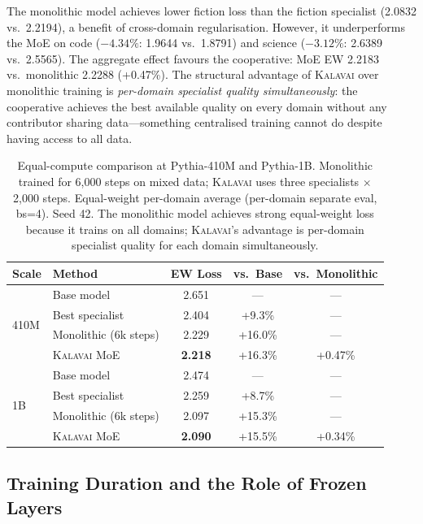 \documentclass{article}
\newcommand{\kalavai}{\textsc{Kalavai}\xspace}
\begin{document}
The monolithic model achieves lower fiction loss than the fiction specialist (2.0832 vs.\ 2.2194), a benefit of cross-domain regularisation. However, it underperforms the MoE on code ($-4.34\%$: 1.9644 vs.\ 1.8791) and science ($-3.12\%$: 2.6389 vs.\ 2.5565). The aggregate effect favours the cooperative: MoE EW 2.2183 vs.\ monolithic 2.2288 (+0.47\%). The structural advantage of \kalavai over monolithic training is \emph{per-domain specialist quality simultaneously}: the cooperative achieves the best available quality on every domain without any contributor sharing data---something centralised training cannot do despite having access to all data.

\begin{table}[h]
\centering
\caption{Equal-compute comparison at Pythia-410M and Pythia-1B. Monolithic trained for 6,000 steps on mixed data; \kalavai uses three specialists $\times$ 2,000 steps. Equal-weight per-domain average (per-domain separate eval, bs=4). Seed 42. The monolithic model achieves strong equal-weight loss because it trains on all domains; \kalavai's advantage is per-domain specialist quality for each domain simultaneously.}
\label{tab:monolithic}
\begin{tabular}{llccc}
\toprule
\textbf{Scale} & \textbf{Method} & \textbf{EW Loss} & \textbf{vs.\ Base} & \textbf{vs.\ Monolithic} \\
\midrule
\multirow{4}{*}{410M}
 & Base model            & 2.651 & ---      & ---       \\
 & Best specialist       & 2.404 & +9.3\%  & ---       \\
 & Monolithic (6k steps) & 2.229 & +16.0\% & ---       \\
 & \kalavai MoE          & \textbf{2.218} & +16.3\% & +0.47\% \\
\midrule
\multirow{4}{*}{1B}
 & Base model            & 2.474 & ---      & ---       \\
 & Best specialist       & 2.259 & +8.7\%  & ---       \\
 & Monolithic (6k steps) & 2.097 & +15.3\% & ---       \\
 & \kalavai MoE          & \textbf{2.090} & +15.5\% & +0.34\% \\
\bottomrule
\end{tabular}
\end{table}

\subsection{Training Duration and the Role of Frozen Layers}
\label{sec:crossover}
\end{document}
